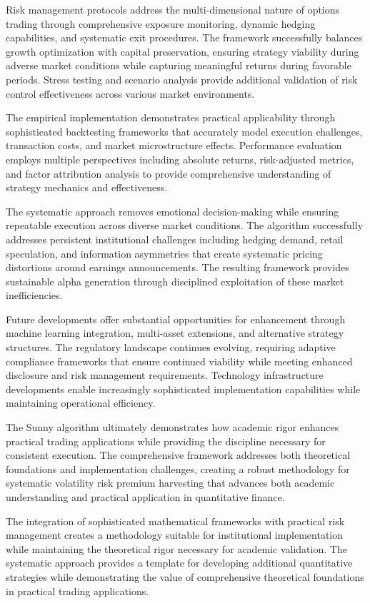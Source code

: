 \documentclass[
  american,
  11pt,
  11pt,
  letterpaper,
  onecolumn]{article}
\begin{document}
Risk management protocols address the multi-dimensional nature of
options trading through comprehensive exposure monitoring, dynamic
hedging capabilities, and systematic exit procedures. The framework
successfully balances growth optimization with capital preservation,
ensuring strategy viability during adverse market conditions while
capturing meaningful returns during favorable periods. Stress testing
and scenario analysis provide additional validation of risk control
effectiveness across various market environments.

The empirical implementation demonstrates practical applicability
through sophisticated backtesting frameworks that accurately model
execution challenges, transaction costs, and market microstructure
effects. Performance evaluation employs multiple perspectives including
absolute returns, risk-adjusted metrics, and factor attribution analysis
to provide comprehensive understanding of strategy mechanics and
effectiveness.

The systematic approach removes emotional decision-making while ensuring
repeatable execution across diverse market conditions. The algorithm
successfully addresses persistent institutional challenges including
hedging demand, retail speculation, and information asymmetries that
create systematic pricing distortions around earnings announcements. The
resulting framework provides sustainable alpha generation through
disciplined exploitation of these market inefficiencies.

Future developments offer substantial opportunities for enhancement
through machine learning integration, multi-asset extensions, and
alternative strategy structures. The regulatory landscape continues
evolving, requiring adaptive compliance frameworks that ensure continued
viability while meeting enhanced disclosure and risk management
requirements. Technology infrastructure developments enable increasingly
sophisticated implementation capabilities while maintaining operational
efficiency.

The Sunny algorithm ultimately demonstrates how academic rigor enhances
practical trading applications while providing the discipline necessary
for consistent execution. The comprehensive framework addresses both
theoretical foundations and implementation challenges, creating a robust
methodology for systematic volatility risk premium harvesting that
advances both academic understanding and practical application in
quantitative finance.

The integration of sophisticated mathematical frameworks with practical
risk management creates a methodology suitable for institutional
implementation while maintaining the theoretical rigor necessary for
academic validation. The systematic approach provides a template for
developing additional quantitative strategies while demonstrating the
value of comprehensive theoretical foundations in practical trading
applications.
\end{document}
